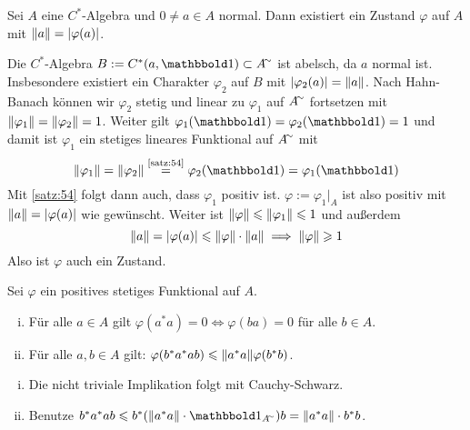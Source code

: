 \begin{satz}[{name=[Existenz von Zuständen zu gegebenen normalen Elementen]},label=satz:55]
	Sei $A$ eine $C^*$-Algebra und $0\neq a \in A$ normal.
	Dann existiert ein Zustand $\varphi$ auf $A$ mit $\norm*{a}=\abs*{\varphi(a)}$.
\end{satz}
\begin{beweis}
	Die $C^*$-Algebra $B := C^*(a, \ind)\subset A^\simm$ ist abelsch, da $a$ normal ist. 
	Insbesondere existiert ein Charakter $\varphi_2$ auf $B$ mit $\abs*{\varphi_2(a)}=\norm*{a}$.
	Nach Hahn-Banach können wir $\varphi_2$ stetig und linear zu $\varphi_1$ auf $A^\simm$ fortsetzen mit $\norm*{\varphi_1} = \norm*{\varphi_2}=1$.
	Weiter gilt $\varphi_1(\ind)= \varphi_2(\ind)=1$ und damit ist $\varphi_1$ ein stetiges lineares Funktional auf $A^\simm$ mit 
	\[
		\norm*{\varphi_1} = \norm*{\varphi_2}\StackText{\ref{satz:54}}{=} \varphi_2(\ind) = \varphi_1(\ind)
	\]
	Mit \autoref{satz:54} folgt dann auch, dass $\varphi_1$ positiv ist. $\varphi := \varphi_1|_A$ ist also positiv mit $\norm*{a}= \abs*{\varphi(a)}$ wie gewünscht.
	Weiter ist $\norm*{\varphi} \le \norm*{\varphi_1} \le 1$ und außerdem 
	\[
		\norm*{a} = \abs*{\varphi(a)} \le \norm*{\varphi} \cdot \norm*{a} \implies \norm*{\varphi} \ge 1
	\]
	Also ist $\varphi$ auch ein Zustand.
\end{beweis}

\begin{proposition}[label=prop:56,{name=[{positive Funktionale und Elemente der Form $a^*a$}]}]
	Sei $\varphi$ ein positives stetiges Funktional auf $A$. 
	\begin{enumerate}[(i),itemsep=0pt]
		\item Für alle $a \in A$ gilt $\varphi(a^*a)=0 \iff \varphi(ba)=0$ für alle $b \in A$.
		\item Für alle $a,b \in A$ gilt: $\varphi(b^*a^*ab) \le \norm*{a^*a}\varphi(b^*b)$.
	\end{enumerate}
\end{proposition}
\begin{beweis}
	\leavevmode
	\begin{enumerate}[(i),itemsep=0pt]
		\item Die nicht triviale Implikation folgt mit Cauchy-Schwarz.
		\item Benutze $b^*a^*ab \le b^* \enbrace*{\norm*{a^*a} \cdot \ind_{A^\simm}}b = \norm*{a^*a} \cdot b^*b$. \qedhere
	\end{enumerate}
\end{beweis}

